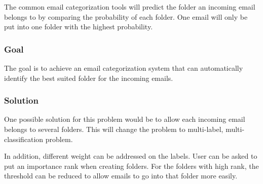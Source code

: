 \documentclass{sig-alternate-05-2015}
\begin{document}
The common email categorization tools will predict the folder an incoming email belongs to by comparing the probability of each folder. One email will only be put into one folder with the highest probability.

\subsubsection{Goal}

The goal is to achieve an email categorization system that can automatically identify the best suited folder for the incoming emails.

\subsubsection{Solution}

One possible solution for this problem would be to allow each incoming email belongs to several folders. This will change the problem to multi-label, multi-classification problem.

In addition, different weight can be addressed on the labels. User can be asked to put an importance rank when creating folders. For the folders with high rank, the threshold can be reduced to allow emails to go into that folder more easily.




%





%
%
\end{document}
